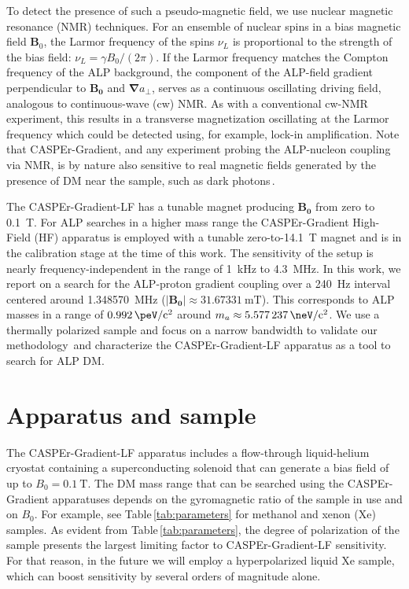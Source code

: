 \documentclass[superscriptaddress,
floatfix,
reprint,
nofootinbib,
amsmath,amssymb,
aps,
prd,
]{revtex4-2}
\begin{document}
To detect the presence of such a pseudo-magnetic field, we use nuclear magnetic resonance (NMR) techniques. 
For an ensemble of nuclear spins in a bias magnetic field $\mathbf{B}_0$, the Larmor frequency of the spins $\nu_L$ is proportional to the strength of the bias field: $\nu_L=\gamma B_0/(2 \pi)$.
If the Larmor frequency matches the Compton frequency of the ALP background, the component of the ALP-field gradient perpendicular to $\mathbf{B_0}$ and $\bm{\nabla} a_\perp$, serves as a continuous oscillating driving field, analogous to continuous-wave (cw) NMR.
As with a conventional cw-NMR experiment, this results in a transverse magnetization oscillating at the Larmor frequency which could be detected using, for example, lock-in amplification.
Note that CASPEr-Gradient, and any experiment probing the ALP-nucleon coupling via NMR, is by nature also sensitive to real magnetic fields generated by the presence of DM near the sample, such as dark photons\,\cite{CASPEr_ZULF_2019,beadle2025dark}.


The CASPEr-Gradient-LF has a tunable magnet producing $\mathbf{B_0}$ from zero to \SI{0.1}{\tesla}. 
For ALP searches in a higher mass range the CASPEr-Gradient High-Field (HF) apparatus is employed with a tunable zero-to-\SI{14.1}{\tesla} magnet and is in the calibration stage at the time of this work.
The sensitivity of the setup is nearly frequency-independent in the range of \SI{1}{\kHz} to \SI{4.3}{\MHz}.
In this work, we report on a search for the ALP-proton gradient coupling over a \SI{240}{\Hz} interval centered around \SI{1.348570}{\MHz} ($|\mathbf{B_0}|\approx\SI{31.67331}{\milli\tesla}$). This corresponds to ALP masses in a range of $\SI{0.992}{\peV/c^2}$ around $m_a\approx\SI{5.577237}{\neV/c^2}$.
We use a thermally polarized sample and focus on a narrow bandwidth to validate our methodology\,\cite{CASPErProposal2014,garcon2017cosmic} and characterize the CASPEr-Gradient-LF apparatus as a tool to search for ALP DM. 

\section{Apparatus and sample}

The CASPEr-Gradient-LF apparatus includes a flow-through liquid-helium cryostat containing a superconducting solenoid that can generate a bias field of up to $B_0 =\SI{0.1}{\tesla}$. The DM mass range that can be searched using the CASPEr-Gradient apparatuses depends on the gyromagnetic ratio of the sample in use and on $B_0$. 
For example, see Table\,\ref{tab:parameters} for methanol and xenon (Xe) samples.
As evident from Table\,\ref{tab:parameters}, the degree of polarization of the sample presents the largest limiting factor to CASPEr-Gradient-LF sensitivity. 
For that reason, in the future we will employ a hyperpolarized liquid Xe sample, which can boost sensitivity by several orders of magnitude alone.
\end{document}

